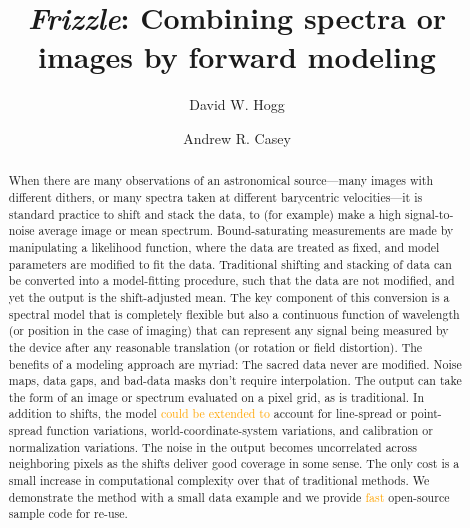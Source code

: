 \documentclass[modern, linenumbers]{aastex631}
\newcommand{\name}{\textsl{Frizzle}}
\newcommand{\modified}[1]{\textcolor{orange}{#1}}
\begin{document}
\title{\large \name: Combining spectra or images by forward modeling}

\author[0000-0003-2866-9403]{David W. Hogg}

\author[0000-0003-0174-0564]{Andrew R. Casey}

\begin{abstract}\noindent
When there are many observations of an astronomical source---many images with different dithers, or many spectra taken at different barycentric velocities---it is standard practice to shift and stack the data, to (for example) make a high signal-to-noise average image or mean spectrum.
Bound-saturating measurements are made by manipulating a likelihood function, where the data are treated as fixed, and model parameters are modified to fit the data.
Traditional shifting and stacking of data can be converted into a model-fitting procedure, such that the data are not modified, and yet the output is the shift-adjusted mean.
The key component of this conversion is a spectral model that is completely flexible but also a continuous function of wavelength (or position in the case of imaging) that can represent any signal being measured by the device after any reasonable translation (or rotation or field distortion).
The benefits of a modeling approach are myriad:
The sacred data never are modified.
Noise maps, data gaps, and bad-data masks don't require interpolation.
The output can take the form of an image or spectrum evaluated on a pixel grid, as is traditional.
In addition to shifts, the model \modified{could be extended to} account for line-spread or point-spread function variations, world-coordinate-system variations, and calibration or normalization variations.
The noise in the output becomes uncorrelated across neighboring pixels as the shifts deliver good coverage in some sense.
The only cost is a small increase in computational complexity over that of traditional methods.
We demonstrate the method with a small data example and we provide \modified{fast} open-source sample code for re-use.
\end{abstract}

\end{document}
